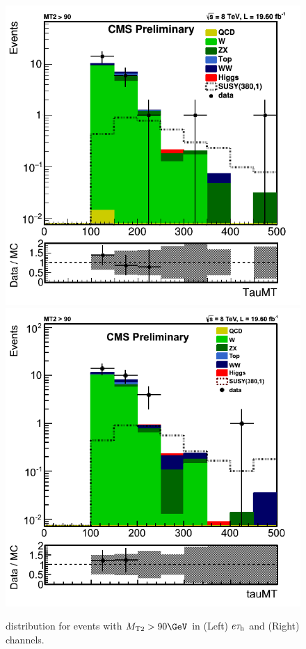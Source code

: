 \begin{figure}[!Hhtb]
\centering
\includegraphics[angle=0,scale=0.375]{SelectionEleTau/TauMT.png}
\includegraphics[angle=0,scale=0.375]{SelectionMuTau/tauMT_Ratio_MT2gt90_unBlinded.png}
\caption{\tauMT distribution for events with $\mttwo>90\GeV$ in (Left) $e\tau_{\rm h}$ and (Right) \muTau channels.}
\label{fig:taumtleptontau}
\end{figure}
